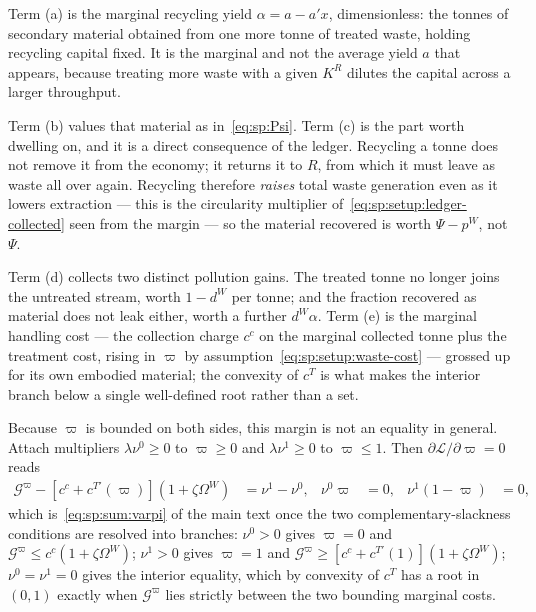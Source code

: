 Term (a) is the marginal recycling yield $\alpha=a-a'x$, dimensionless: the tonnes of secondary material obtained from one more tonne of treated waste, holding recycling capital fixed. It is the marginal and not the average yield $a$ that appears, because treating more waste with a given $K^R$ dilutes the capital across a larger throughput.

Term (b) values that material as in~\eqref{eq:sp:Psi}. Term (c) is the part worth dwelling on, and it is a direct consequence of the ledger. Recycling a tonne does not remove it from the economy; it returns it to $R$, from which it must leave as waste all over again. Recycling therefore \emph{raises} total waste generation even as it lowers extraction --- this is the circularity multiplier of~\eqref{eq:sp:setup:ledger-collected} seen from the margin --- so the material recovered is worth $\Psi-p^W$, not $\Psi$.

Term (d) collects two distinct pollution gains. The treated tonne no longer joins the untreated stream, worth $1-d^W$ per tonne; and the fraction recovered as material does not leak either, worth a further $d^W\alpha$. Term (e) is the marginal handling cost --- the collection charge $c^c$ on the marginal collected tonne plus the treatment cost, rising in $\varpi$ by assumption~\eqref{eq:sp:setup:waste-cost} --- grossed up for its own embodied material; the convexity of $c^T$ is what makes the interior branch below a single well-defined root rather than a set.

 Because $\varpi$ is bounded on both sides, this margin is
not an equality in general. Attach multipliers $\lambda\nu^0\ge0$ to $\varpi\ge0$ and
$\lambda\nu^1\ge0$ to $\varpi\le1$. Then $\partial\mathcal L/\partial\varpi=0$ reads
\begin{align}
\mathcal G^\varpi-\left[c^c+c^{T\prime}\left(\varpi\right)\right]\left(1+\zeta\Omega^W\right)
&= \nu^1-\nu^0,
&
\nu^0\varpi &= 0,
&
\nu^1\left(1-\varpi\right) &= 0,
\label{eq:sp:foc:varpi-kkt}
\end{align}
which is~\eqref{eq:sp:sum:varpi} of the main text once the two complementary-slackness conditions are
resolved into branches: $\nu^0>0$ gives $\varpi=0$ and
$\mathcal G^\varpi\le c^c\left(1+\zeta\Omega^W\right)$; $\nu^1>0$ gives
$\varpi=1$ and $\mathcal G^\varpi\ge \left[c^c+c^{T\prime}\left(1\right)\right]\left(1+\zeta\Omega^W\right)$;
$\nu^0=\nu^1=0$ gives the interior equality, which by convexity of $c^T$ has a root in
$\left(0,1\right)$ exactly when $\mathcal G^\varpi$ lies strictly between the two bounding marginal
costs.

